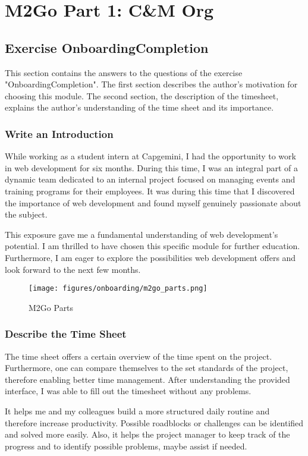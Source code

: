 \chapter{M2Go Part 1: C\&M Org}
\label{cha:cm_org}

\section{Exercise OnboardingCompletion}
This section contains the answers to the questions of the exercise "OnboardingCompletion". 
The first section describes the author's motivation for choosing this module. 
The second section, the description of the timesheet, explains the author's understanding of the time sheet and its importance.

\subsection*{Write an Introduction}
While working as a student intern at Capgemini, I had the opportunity to work in web development for six months.
During this time, I was an integral part of a dynamic team dedicated to an internal project focused on managing events and training programs for their employees.
It was during this time that I discovered the importance of web development and found myself genuinely passionate about the subject.

This exposure gave me a fundamental understanding of web development's potential.
I am thrilled to have chosen this specific module for further education. 
Furthermore, I am eager to explore the possibilities web development offers and look forward to the next few months.

\begin{figure}[H]
    \centering
    \texttt{[image: figures/onboarding/m2go\_parts.png]}
    \caption{M2Go Parts}
    \label{fig:m2go_parts}
\end{figure}

\subsection*{Describe the Time Sheet}
The time sheet offers a certain overview of the time spent on the project. 
Furthermore, one can compare themselves to the set standards of the project, therefore enabling better time management.
After understanding the provided interface, I was able to fill out the timesheet without any problems.

It helps me and my colleagues build a more structured daily routine and therefore increase productivity. Possible roadblocks or challenges can be identified and solved more easily.
Also, it helps the project manager to keep track of the progress and to identify possible problems, maybe assist if needed.

